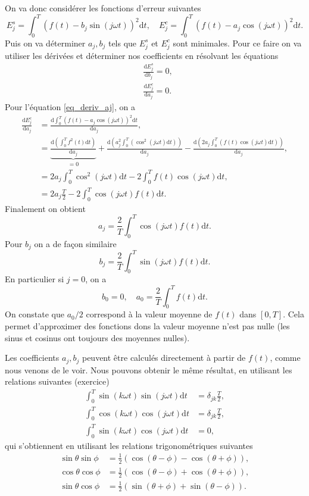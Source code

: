 \documentclass[a4paper,12pt]{book}
\newcommand{\dd}{\mathrm{d}}
\newcommand{\dDeriv}[2]{\frac{\dd #1}{\dd #2}}
\begin{document}
On va donc considérer les fonctions d'erreur suivantes
\begin{equation}
 E^s_j=\int_0^T(f(t)-b_j\sin(j\omega t))^2\dd t,\quad E^c_j=\int_0^T(f(t)-a_j\cos(j\omega t))^2\dd t.
\end{equation}
Puis on va déterminer $a_j,b_j$ tels que $E_j^s$ et $E_j^c$ sont minimales. Pour ce faire on va utiliser les dérivées
et déterminer nos coefficients en résolvant les équations
\begin{align}
 &\dDeriv{E^s_j}{b_j}=0,\label{eq_deriv_bj}\\
 &\dDeriv{E^c_j}{a_j}=0.\label{eq_deriv_aj}
\end{align}
Pour l'équation \eqref{eq_deriv_aj}, on a 
\begin{align}
 \dDeriv{E^c_j}{a_j}&=\dDeriv{\int_0^T(f(t)-a_j\cos(j\omega t))^2\dd t}{a_j},\nonumber\\
 &=\underbrace{\dDeriv{(\int_0^Tf^2(t)\dd t)}{a_j}}_{=0}+\dDeriv{(a_j^2\int_0^T(\cos^2(j\omega t)\dd t))}{a_j}-\dDeriv{(2a_j\int_0^T(f(t)\cos(j\omega t)\dd t))}{a_j},\nonumber\\
 &=2a_j\int_0^T\cos^2(j\omega t)\dd t-2\int_0^Tf(t)\cos(j\omega t)\dd t,\nonumber\\
 &=2a_j\frac{T}{2}-2\int_0^T\cos(j\omega t)f(t)\dd t.
\end{align}
Finalement on obtient
\begin{equation}
 a_j=\frac{2}{T}\int_0^T\cos(j\omega t)f(t)\dd t.
\end{equation}
Pour $b_j$ on a de façon similaire 
\begin{equation}
 b_j=\frac{2}{T}\int_0^T\sin(j\omega t)f(t)\dd t.
\end{equation}
En particulier si $j=0$, on a 
\begin{equation}
b_0=0,\quad a_0=\frac{2}{T}\int_0^T f(t)\dd t.
\end{equation}
On constate que $a_0/2$ correspond à la valeur moyenne de $f(t)$ dans $[0,T]$. Cela 
permet d'approximer des fonctions dons la valeur moyenne n'est pas nulle (les sinus et cosinus ont toujours
des moyennes nulles).

Les coefficients $a_j,b_j$ peuvent être calculés directement à partir de $f(t)$,
comme nous venons de le voir. Nous pouvons obtenir le même résultat, en utilisant les relations suivantes (exercice)
\begin{align}
 \int_0^T \sin(k \omega t)\sin(j \omega t)\dd t&=\delta_{jk} \frac{T}{2},\\
 \int_0^T \cos(k \omega t)\cos(j \omega t)\dd t&=\delta_{jk} \frac{T}{2},\\
 \int_0^T \sin(k \omega t)\cos(j \omega t)\dd t&=0,
\end{align}
qui s'obtiennent en utilisant les relations trigonométriques suivantes
\begin{align}
 \sin\theta\sin\phi&= \frac{1}{2}\left(\cos(\theta-\phi)-\cos(\theta+\phi)\right),\\
 \cos\theta\cos\phi&= \frac{1}{2}\left(\cos(\theta-\phi)+\cos(\theta+\phi)\right),\\
 \sin\theta\cos\phi&= \frac{1}{2}\left(\sin(\theta+\phi)+\sin(\theta-\phi)\right).
\end{align}
\end{document}
